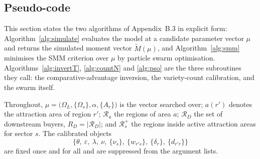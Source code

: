 %
%
%
%

\subsection{Pseudo-code}
\label{app:pseudocode}

This section states the two algorithms of Appendix~B.3 in
explicit form: Algorithm~\ref{alg:simulate} evaluates the model at a candidate
parameter vector $\mu$ and returns the simulated moment vector
$\widetilde{M}(\mu)$, and Algorithm~\ref{alg:smm} minimises the SMM criterion
over $\mu$ by particle swarm optimisation. Algorithms~\ref{alg:invertT},
\ref{alg:countN} and \ref{alg:pso} are the three subroutines they call: the
comparative-advantage inversion, the variety-count calibration, and the swarm
itself.

Throughout, $\mu=\bigl(\Omega_L,\{\Omega_s\},\alpha,\{A_r\}\bigr)$ is the vector
searched over; $a(r')$ denotes the attraction area of region $r'$;
$\mathcal{R}_a$ the regions of area $a$; $\mathcal{R}_D$ the set of downstream
buyers, $R_D=|\mathcal{R}_D|$; and $\mathcal{R}^+_s$ the regions inside active
attraction areas for sector $s$. The calibrated objects
\[
  \bigl\{\theta,\ \varepsilon,\ \lambda,\ \nu,\ \{\nu_s\},\
  \{w_{r's}\},\ \{\delta_r\},\ \{d_{r'r}\}\bigr\}
\]
are fixed once and for all and are suppressed from the argument lists.

